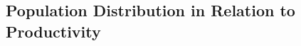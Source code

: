 \documentclass[11pt]{article}
\begin{document}




\subsection{Population Distribution in Relation to Productivity}
\end{document}
